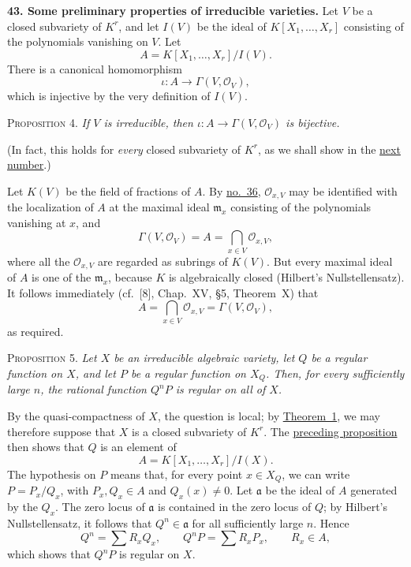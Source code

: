 
\medskip
{}\label{fac:II:3:no:43}
\textbf{43. Some preliminary properties of irreducible varieties.}
Let $V$ be a closed subvariety of $K^r$, and let $I(V)$ be the ideal of $K[X_1,\ldots,X_r]$ consisting of the polynomials vanishing on $V$. Let
\[
A=K[X_1,\ldots,X_r]/I(V).
\]
There is a canonical homomorphism
\[
\iota:A\longrightarrow\Gamma(V,\mathcal{O}_V),
\]
which is injective by the very definition of $I(V)$.

\label{fac:II:3:no:43:prop:4}
\textsc{Proposition 4.} \textit{If $V$ is irreducible, then $\iota:A\to\Gamma(V,\mathcal{O}_V)$ is bijective.}

(In fact, this holds for \textit{every} closed subvariety of $K^r$, as we shall show in the \hyperref[fac:II:3:no:44]{next number}.)

Let $K(V)$ be the field of fractions of $A$. By \hyperref[fac:II:1:no:36]{no.~36}, $\mathcal{O}_{x,V}$ may be identified with the localization of $A$ at the maximal ideal $\mathfrak{m}_x$ consisting of the polynomials vanishing at $x$, and
\[
\Gamma(V,\mathcal{O}_V)=A=\bigcap_{x\in V}\mathcal{O}_{x,V},
\]
where all the $\mathcal{O}_{x,V}$ are regarded as subrings of $K(V)$. But every maximal ideal of $A$ is one of the $\mathfrak{m}_x$, because $K$ is algebraically closed (Hilbert's Nullstellensatz). It follows immediately (cf.~[8], Chap.~XV, \S5, Theorem~X) that
\[
A=\bigcap_{x\in V}\mathcal{O}_{x,V}=\Gamma(V,\mathcal{O}_V),
\]
as required.

\label{fac:II:3:no:43:prop:5}
\textsc{Proposition 5.} \textit{Let $X$ be an irreducible algebraic variety, let $Q$ be a regular function on $X$, and let $P$ be a regular function on $X_Q$. Then, for every sufficiently large $n$, the rational function $Q^nP$ is regular on all of $X$.}

By the quasi-compactness of $X$, the question is local; by \hyperref[fac:II:3:no:42:thm:1]{Theorem~1}, we may therefore suppose that $X$ is a closed subvariety of $K^r$. The \hyperref[fac:II:3:no:43:prop:4]{preceding proposition} then shows that $Q$ is an element of
\[
A=K[X_1,\ldots,X_r]/I(X).
\]
The hypothesis on $P$ means that, for every point $x\in X_Q$, we can write $P=P_x/Q_x$, with $P_x,Q_x\in A$ and $Q_x(x)\neq0$. Let $\mathfrak{a}$ be the ideal of $A$ generated by the $Q_x$. The zero locus of $\mathfrak{a}$ is contained in the zero locus of $Q$; by Hilbert's Nullstellensatz, it follows that $Q^n\in\mathfrak{a}$ for all sufficiently large $n$. Hence
\[
Q^n=\sum R_xQ_x,
\qquad
Q^nP=\sum R_xP_x,
\qquad R_x\in A,
\]
which shows that $Q^nP$ is regular on $X$.

